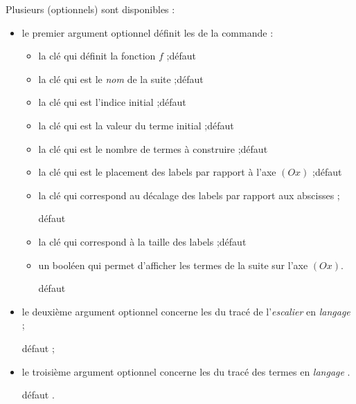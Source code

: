 \begin{cautionblock}
Plusieurs  (optionnels) sont disponibles :

\begin{itemize}
\item le premier argument optionnel définit les  de la commande :
\begin{itemize}
	\item la clé  qui définit la fonction $f$ ;\hfill{}défaut 
	\item la clé  qui est le \textit{nom} de la suite ;\hfill{}défaut 
	\item la clé  qui est l'indice initial ;\hfill{}défaut 
	\item la clé  qui est la valeur du terme initial ;\hfill{}défaut 
	\item la clé  qui est le nombre de termes à construire ;\hfill{}défaut 
	\item la clé  qui est le placement des labels par rapport à l'axe $(Ox)$ ;\hfill{}défaut 
	\item la clé  qui correspond au décalage des labels par rapport aux abscisses ;
	
	\hfill{}défaut \Cle{6pt}
	\item la clé  qui correspond à la taille des labels ;\hfill{}défaut 
	\item un booléen  qui permet d'afficher les termes de la suite sur l'axe $(Ox)$.
	
	\hfill{}défaut 
\end{itemize}
\item le deuxième argument optionnel concerne les  du tracé de l'\textit{escalier} en \textit{langage \TikZ} ;

\hfill{}défaut  ;
\item le troisième argument optionnel concerne les  du tracé des termes en \textit{langage \TikZ}.

\hfill{}défaut .
\end{itemize}
\vspace*{-\baselineskip}\leavevmode
\end{cautionblock}

